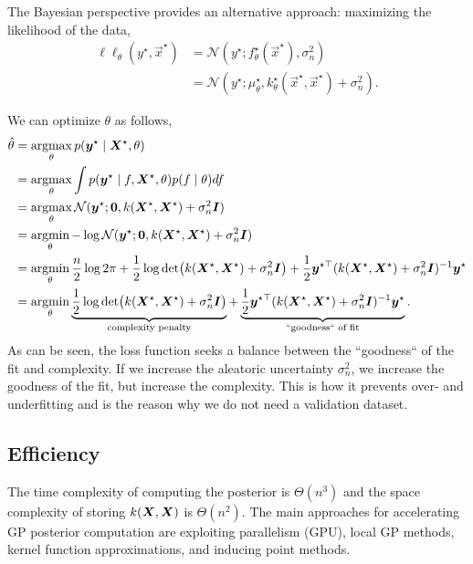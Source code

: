 The Bayesian perspective provides an alternative approach: maximizing the
likelihood of the data,
\begin{align*}
  \ell \ell_{\theta}(y^\star,\vec{x}^\star) &= \mathcal{N}(y^\star; f_{\theta}^\star(\vec{x}^\star), \sigma_n^2) \\
  &= \mathcal{N}(y^\star; \mu_{\theta}^\star, k_{\theta}^\star(\vec{x}^\star,\vec{x}^\star) + \sigma_n^2)
.\end{align*}

We can optimize $\theta$ as follows,
\begin{align*}
  \hat{\theta} &= \argmax_\theta p(\bm{y}^\star\mid \mat{X}^\star, \theta) \\
  &= \argmax_\theta \int p(\bm{y}^\star\mid f,\mat{X}^\star, \theta) p(f\mid \theta) df \\
  &= \argmax_\theta \mathcal{N}(\bm{y}^\star; \bm{0}, k(\mat{X}^\star,\mat{X}^\star) + \sigma_n^2\bm{I}) \\
  &= \argmin_\theta -\log \mathcal{N}(\bm{y}^\star; \bm{0}, k(\mat{X}^\star,\mat{X}^\star) + \sigma_n^2\bm{I}) \\
  &= \argmin_\theta \frac{n}{2} \log 2\pi + \frac{1}{2}\log \det{k(\mat{X}^\star,\mat{X}^\star)+\sigma_n^2\bm{I}}+ \frac{1}{2}\bm{y}^{\star\top} (k(\mat{X}^\star,\mat{X}^\star) + \sigma_n^2\bm{I})^{-1}\bm{y}^\star \\
  &= \argmin_\theta \underbrace{\frac{1}{2}\log \det{k(\mat{X}^\star,\mat{X}^\star)+\sigma_n^2\bm{I}}}_{\text{complexity penalty}} + \underbrace{\frac{1}{2}\bm{y}^{\star\top} (k(\mat{X}^\star,\mat{X}^\star) + \sigma_n^2\bm{I})^{-1}\bm{y}^\star}_{\text{``goodness`` of fit}}
.\end{align*}
As can be seen, the loss function seeks a balance between the ``goodness`` of
the fit and complexity. If we increase the aleatoric uncertainty
$\sigma_n^2$, we increase the goodness of the fit, but increase the
complexity. This is how it prevents over- and underfitting and is the reason
why we do not need a validation dataset.


\subsection{Efficiency}

The time complexity of computing the posterior is $\Theta(n^3)$ and the space complexity of storing
$k(\bm{X},\bm{X})$ is $\Theta(n^2)$. The main approaches for accelerating GP
posterior computation are exploiting parallelism (GPU), local GP
methods, kernel function approximations, and inducing point methods.

